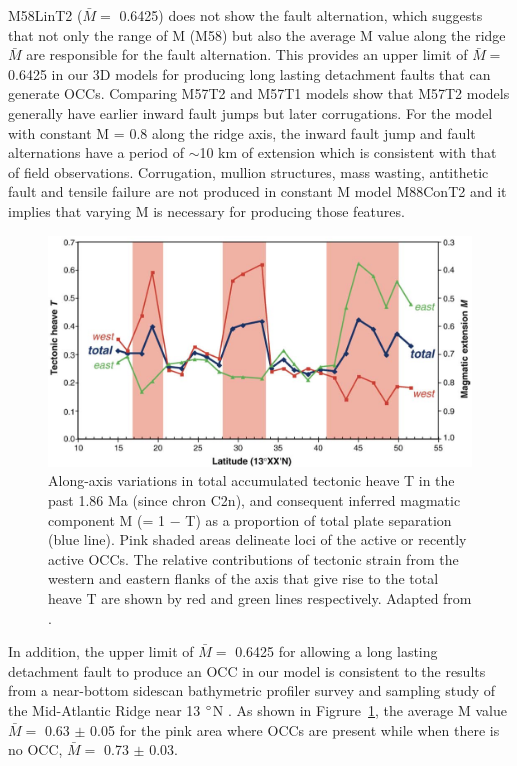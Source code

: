 M58LinT2 ($\bar{M} =$ 0.6425) does not show the fault alternation, which suggests that not only the range of M (M58) but also the average M value along the ridge $\bar{M}$ are responsible for the fault alternation. This provides an upper limit of $\bar{M} =$ 0.6425 in our 3D models for producing long lasting detachment faults that can generate OCCs. Comparing M57T2 and M57T1 models show that M57T2 models generally have earlier inward fault jumps but later corrugations. For the model with constant M = 0.8 along the ridge axis, the inward fault jump and fault alternations have a period of $\sim$10 km of extension which is consistent with that of field observations. Corrugation, mullion structures, mass wasting, antithetic fault and tensile failure are not produced in constant M model M88ConT2 and it implies that varying M is necessary for producing those features.

\begin{figure}[h]
 \centering
  \includegraphics[width=1\textwidth]{./Figures/fig_Discussion_ResultsSummary_MacLeod2009.eps}
 \caption[Field observation results adapted from \citep{MacLeod2009}.]{Along-axis variations in total accumulated tectonic heave T in the past 1.86 Ma (since chron C2n), and consequent inferred magmatic component M (= 1 $-$ T) as a proportion of total plate separation (blue line). Pink shaded areas delineate loci of the active or recently active OCCs. The relative contributions of tectonic strain from the western and eastern flanks of the axis that give rise to the total heave T are shown by red and green lines respectively. Adapted from \citep{MacLeod2009}. }
 \label{fig_Discussion_ResultsSummary_MacLeod2009}
\end{figure}

In addition, the upper limit of $\bar{M} = $ 0.6425 for allowing a long lasting detachment fault to produce an OCC in our model is consistent to the results from a near-bottom sidescan bathymetric profiler survey and sampling study of the Mid-Atlantic Ridge near 13 $\degree$N \citep{MacLeod2009}. As shown in Figrure~\hyperref[fig_Discussion_ResultsSummary_MacLeod2009]{\ref{fig_Discussion_ResultsSummary_MacLeod2009}}, the average M value $\bar{M} =$ 0.63 $\pm$ 0.05 for the pink area where OCCs are present while when there is no OCC, $\bar{M} =$ 0.73 $\pm$ 0.03.

